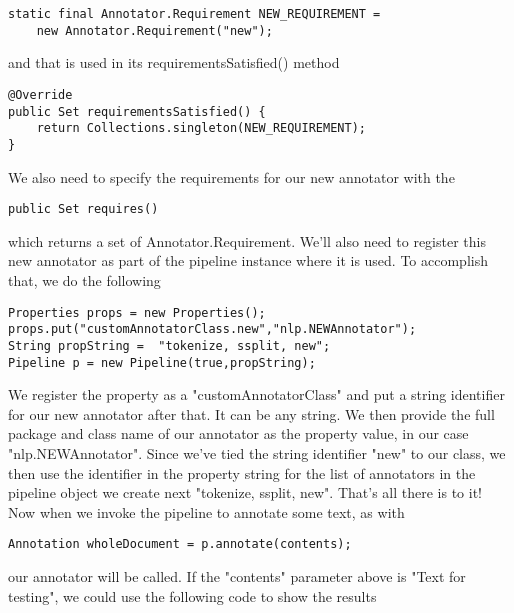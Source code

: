 \documentclass{book}
\begin{document}
\begin{lstlisting}[basicstyle=\ttfamily\small\bfseries]
static final Annotator.Requirement NEW_REQUIREMENT = 
    new Annotator.Requirement("new");
\end{lstlisting}

and that is used in its requirementsSatisfied() method

\begin{lstlisting}[basicstyle=\ttfamily\small\bfseries]
@Override
public Set requirementsSatisfied() {
    return Collections.singleton(NEW_REQUIREMENT);
}
\end{lstlisting}

We also need to specify the requirements for our new annotator with the

\begin{lstlisting}[basicstyle=\ttfamily\small\bfseries]
public Set requires()
\end{lstlisting}

which returns a set of Annotator.Requirement. We'll also need to register this
new annotator as part of the pipeline instance where it is used. To accomplish
that, we do the following

\begin{lstlisting}[basicstyle=\ttfamily\small\bfseries]
Properties props = new Properties();
props.put("customAnnotatorClass.new","nlp.NEWAnnotator");
String propString =  "tokenize, ssplit, new";
Pipeline p = new Pipeline(true,propString);
\end{lstlisting}

We register the property as a "customAnnotatorClass" and put a string identifier
for our new annotator after that. It can be any string. We then provide the full
package and class name of our annotator as the property value, in our case
"nlp.NEWAnnotator". Since we've tied the string identifier "new" to our class,
we then use the identifier in the property string for the list of annotators in
the pipeline object we create next "tokenize, ssplit, new". That's all there is
to it! Now when we invoke the pipeline to annotate some text, as with

\begin{lstlisting}[basicstyle=\ttfamily\small\bfseries]
Annotation wholeDocument = p.annotate(contents);
\end{lstlisting}

our annotator will be called. If the "contents" parameter above is "Text for
testing", we could use the following code to show the results
\end{document}
